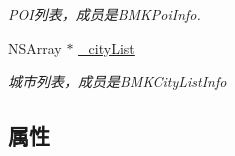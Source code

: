 \begin{DoxyCompactItemize}
\begin{DoxyCompactList}\small\item\em P\+O\+I列表，成员是\+B\+M\+K\+Poi\+Info. \end{DoxyCompactList}\item 
\hypertarget{interface_b_m_k_poi_result_acf4e2c4c0040c79368d2da36bfd7c092}{}N\+S\+Array $\ast$ \hyperlink{interface_b_m_k_poi_result_acf4e2c4c0040c79368d2da36bfd7c092}{\+\_\+city\+List}\label{interface_b_m_k_poi_result_acf4e2c4c0040c79368d2da36bfd7c092}

\begin{DoxyCompactList}\small\item\em 城市列表，成员是\+B\+M\+K\+City\+List\+Info \end{DoxyCompactList}\end{DoxyCompactItemize}
\subsection*{属性}
